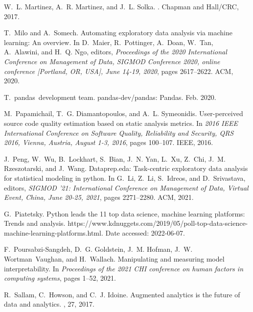 \documentclass[11pt]{article}
\begin{document}
\begin{thebibliography}{10}
\begin{small}
W.~L. Martinez, A.~R. Martinez, and J.~L. Solka.
.
\newblock Chapman and Hall/CRC, 2017.

T.~Milo and A.~Somech.
\newblock Automating exploratory data analysis via machine learning: An
  overview.
\newblock In D.~Maier, R.~Pottinger, A.~Doan, W.~Tan, A.~Alawini, and H.~Q.
  Ngo, editors, {\em Proceedings of the 2020 International Conference on
  Management of Data, {SIGMOD} Conference 2020, online conference [Portland,
  OR, USA], June 14-19, 2020}, pages 2617--2622. {ACM}, 2020.

T.~pandas~development team.
\newblock pandas-dev/pandas: Pandas.
\newblock Feb. 2020.

M.~Papamichail, T.~G. Diamantopoulos, and A.~L. Symeonidis.
\newblock User-perceived source code quality estimation based on static
  analysis metrics.
\newblock In {\em 2016 {IEEE} International Conference on Software Quality,
  Reliability and Security, {QRS} 2016, Vienna, Austria, August 1-3, 2016},
  pages 100--107. {IEEE}, 2016.

J.~Peng, W.~Wu, B.~Lockhart, S.~Bian, J.~N. Yan, L.~Xu, Z.~Chi, J.~M.
  Rzeszotarski, and J.~Wang.
\newblock Dataprep.eda: Task-centric exploratory data analysis for statistical
  modeling in python.
\newblock In G.~Li, Z.~Li, S.~Idreos, and D.~Srivastava, editors, {\em {SIGMOD}
  '21: International Conference on Management of Data, Virtual Event, China,
  June 20-25, 2021}, pages 2271--2280. {ACM}, 2021.

G.~Piatetsky.
\newblock Python leads the 11 top data science, machine learning platforms:
  Trends and analysis.
\newblock
  {https://www.kdnuggets.com/2019/05/poll-top-data-science-machine-learning-platforms.html.
  Date accessed: 2022-06-07}.

F.~Poursabzi-Sangdeh, D.~G. Goldstein, J.~M. Hofman, J.~W. Wortman~Vaughan, and
  H.~Wallach.
\newblock Manipulating and measuring model interpretability.
\newblock In {\em Proceedings of the 2021 CHI conference on human factors in
  computing systems}, pages 1--52, 2021.

R.~Sallam, C.~Howson, and C.~J. Idoine.
\newblock Augmented analytics is the future of data and analytics.
, 27, 2017.


\end{small}
\end{thebibliography}
\end{document}
